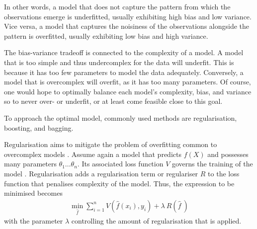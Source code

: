 \vspace{-\the\belowdisplayskip}
\noindent In other words, a model that does not capture the pattern from which 
the observations emerge is underfitted, usually exhibiting high bias and low 
variance. Vice versa, a model that captures the noisiness of the observations
alongside the pattern is overfitted, usually exhibiting low bias and high
variance.

The bias-variance tradeoff is connected to the complexity of a model. A model 
that is too simple and thus undercomplex for the data will underfit. This is 
because it has too few parameters to model the data adequately. Conversely, a 
model that is overcomplex will overfit, as it has too many parameters. Of
course, one would hope to optimally balance each model's complexity, bias, and
variance so to never over- or underfit, or at least come feasible close to
this goal.

To approach the optimal model, commonly used methods are regularisation,
boosting, and bagging.
\bigbreak

\noindent Regularisation \label{mar:regularisation} 
aims to mitigate the problem of overfitting common to overcomplex models
\citep {Deisenroth2020}. Assume again a model that predicts $f\!\left(X\right)$
and possesses many parameters $\theta_1\dots\theta_n$. Its associated loss 
function $V$ governs the training of the model \citep{Rosasco2003}. 
Regularisation adds a regularisation term or regulariser $R$ to the loss 
function that penalises complexity of the model. Thus, the expression to be 
minimised becomes
\begin{align*}
  \min_{\widehat{f}}\sum_{i=1}^n
  V\!\left(\widehat{f}\!\left(x_i\right),y_i\right)+
  \lambda\:R\!\left(\widehat{f}\:\right)
\end{align*}
with the parameter $\lambda$ controlling the amount of regularisation that is
applied.

